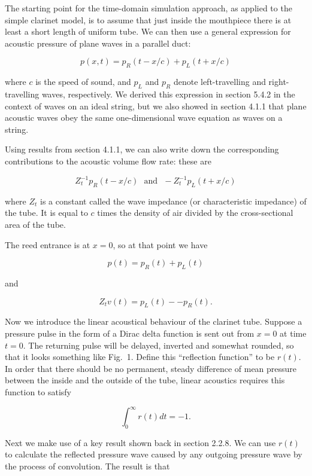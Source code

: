   The starting point for the time-domain simulation approach, as applied to the 
  simple clarinet model, is to assume that just inside the mouthpiece there is 
  at least a short length of uniform tube. We can then use a general expression 
  for acoustic pressure of plane waves in a parallel duct: 

  $$p(x,t) = p_R(t-x/c) + p_L(t+x/c) \tag{1}$$ 

  where $c$ is the speed of sound, and $p_L$ and $p_R$ denote left-travelling 
  and right-travelling waves, respectively. We derived this expression in 
  section 5.4.2 in the context of waves on an ideal string, but we also showed 
  in section 4.1.1 that plane acoustic waves obey the same one-dimensional wave 
  equation as waves on a string. 

  Using results from section 4.1.1, we can also write down the corresponding 
  contributions to the acoustic volume flow rate: these are 

  $$Z_t^{-1}p_R(t-x/c) \mathrm{~~~and~~~} -Z_t^{-1}p_L(t+x/c) \tag{2}$$ 

  where $Z_t$ is a constant called the wave impedance (or characteristic 
  impedance) of the tube. It is equal to $c$ times the density of air divided 
  by the cross-sectional area of the tube. 

  The reed entrance is at $x=0$, so at that point we have 

  $$p(t)=p_R(t) + p_L(t) \tag{3}$$ 

  and 

  $$Z_t v(t)=p_L(t) -- p_R(t) . \tag{4}$$ 

  Now we introduce the linear acoustical behaviour of the clarinet tube. 
  Suppose a pressure pulse in the form of a Dirac delta function is sent out 
  from $x=0$ at time $t=0$. The returning pulse will be delayed, inverted and 
  somewhat rounded, so that it looks something like Fig.\ 1. Define this 
  ``reflection function'' to be $r(t)$. In order that there should be no 
  permanent, steady difference of mean pressure between the inside and the 
  outside of the tube, linear acoustics requires this function to satisfy 

  $$\int_0^\infty{r(t) dt} =-1 . \tag{5}$$ 


  Next we make use of a key result shown back in section 2.2.8. We can use 
  $r(t)$ to calculate the reflected pressure wave caused by any outgoing 
  pressure wave by the process of convolution. The result is that 

